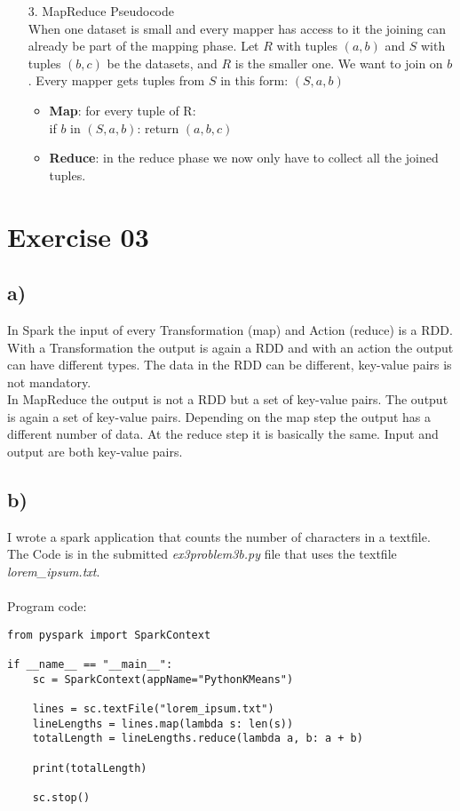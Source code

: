 \documentclass[11pt,a4paper]{scrartcl}
\begin{document}
\begin{itemize}
		\item[3.] MapReduce Pseudocode \\
		When one dataset is small and every mapper has access to it the joining can already be part of the mapping phase. Let $R$ with tuples $(a,b)$ and $S$ with tuples $(b,c)$ be the datasets, and $R$ is the smaller one. We want to join on $b$. Every mapper gets tuples from $S$ in this form: $(S,a,b)$
		\begin{itemize}
			\item \textbf{Map}: for every tuple of R: \\
			if $b$ in $(S,a,b)$: return $(a,b,c)$
			\item \textbf{Reduce}: in the reduce phase we now only have to collect all the joined tuples. 
		\end{itemize}



	\end{itemize}
	
	
\section*{Exercise 03}

\subsection*{a)}

In Spark the input of every Transformation (map) and Action (reduce) is a RDD. With a Transformation the output is again a RDD and with an action the output can have different types. The data in the RDD can be different, key-value pairs is not mandatory.\\
In MapReduce the output is not a RDD but a set of key-value pairs. The output is again a set of key-value pairs. Depending on the map step the output has a different number of data. At the reduce step it is basically the same. Input and output are both key-value pairs. 

\subsection*{b)}

I wrote a spark application that counts the number of characters in a textfile. The Code is in the submitted \textit{ex3problem3b.py} file that uses the textfile \textit{lorem\_ipsum.txt}.\\\\
Program code:
\lstset{breaklines=true}
\begin{lstlisting}
from pyspark import SparkContext

if __name__ == "__main__":
    sc = SparkContext(appName="PythonKMeans")

    lines = sc.textFile("lorem_ipsum.txt")
    lineLengths = lines.map(lambda s: len(s))
    totalLength = lineLengths.reduce(lambda a, b: a + b)

    print(totalLength)

    sc.stop()
\end{lstlisting}
\end{document}
